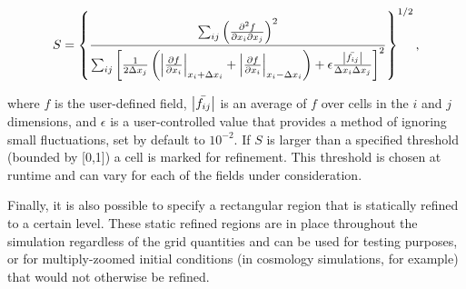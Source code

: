 \begin{enumerate}
 \begin{equation}
   S = \left\{ \frac{\sum_{ij}\left( \frac{\partial^2f}{\partial x_i \partial x_j} \right)^2}{\sum_{ij}\left[ \frac{1}{2\Delta x_j}\left( \abs{\frac{\partial f}{\partial x_i}}_{x_i+\Delta x_i} + \abs{\frac{\partial f}{\partial x_i}}_{x_i-\Delta x_i} \right) + \epsilon \frac{\abs{\bar{f_{ij}}}}{\Delta x_i \Delta x_j} \right]^2} \right\}^{1/2},
   \label{eq:second-deriv_analytical}
 \end{equation}

  where $f$ is the user-defined field, $\left|\bar{f_{ij}}\right|$ is an average of
  $f$ over cells in the $i$ and $j$ dimensions, and $\epsilon$ is
  a user-controlled value that provides a method of ignoring small
  fluctuations, set by default to $10^{-2}$.  If $S$ is larger than a specified
  threshold (bounded by [0,1]) a cell is marked for refinement. This threshold
  is chosen at runtime and can vary for each of the fields under consideration.

\end{enumerate}

Finally, it is also possible to specify a rectangular region that is
statically refined to a certain level.  These static refined regions
are in place throughout the simulation regardless of the grid
quantities and can be used for testing purposes, or for
multiply-zoomed initial conditions (in cosmology simulations, for
example) that would not otherwise be refined.


